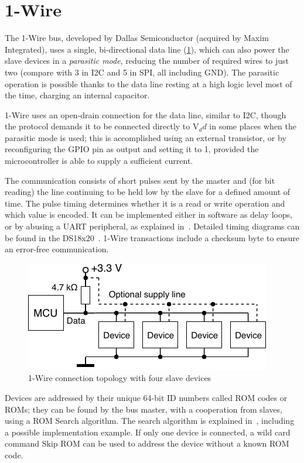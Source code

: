 \section{1-Wire} \label{sec:theory_1wire}

The 1-Wire bus, developed by Dallas Semiconductor (acquired by Maxim Integrated), uses a single, bi-directional data line (\cref{fig:1w_topology}), which can also power the slave devices in a \textit{parasitic mode}, reducing the number of required wires to just two (compare with 3 in \gls{I2C} and 5 in \gls{SPI}, all including \gls{GND}). The parasitic operation is possible thanks to the data line resting at a high logic level most of the time, charging an internal capacitor.

1-Wire uses an open-drain connection for the data line, similar to \gls{I2C}, though the protocol demands it to be connected directly to V$_dd$ in some places when the parasitic mode is used; this is accomplished using an external transistor, or by reconfiguring the GPIO pin as output and setting it to 1, provided the microcontroller is able to supply a sufficient current.

The communication consists of short pulses sent by the master and (for bit reading) the line continuing to be held low by the slave for a defined amount of time. The pulse timing determines whether it is a read or write operation and which value is encoded. It can be implemented either in software as delay loops, or by abusing a \gls{UART} peripheral, as explained in~\cite{ow-uart}. Detailed timing diagrams can be found in the DS18x20~\cite{ow-datasheet}. 1-Wire transactions include a checksum byte to ensure an error-free communication.

\begin{figure}[h]
	\centering
	\includegraphics[scale=1] {img/1w-connection.pdf}
	\caption{\label{fig:1w_topology}1-Wire connection topology with four slave devices}
\end{figure}

Devices are addressed by their unique 64-bit ID numbers called ROM codes or ROMs; they can be found by the bus master, with a cooperation from slaves, using a ROM Search algorithm. The search algorithm is explained in~\cite{ow-appnote}, including a possible implementation example. If only one device is connected, a wild card command Skip ROM can be used to address the device without a known ROM code.

